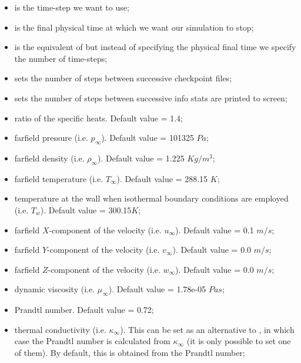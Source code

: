 \begin{itemize}
\item {} is the time-step we want to use;
\item {} is the final physical time at which we want our simulation to stop;
\item {} is the equivalent of  but instead of specifying the
physical final time we specify the number of time-steps;
\item {} sets the number of steps between successive checkpoint files;
\item {} sets the number of steps between successive info stats are printed
to screen;
\item {} ratio of the specific heats. Default value = 1.4;
\item {} farfield pressure (i.e. $p_{\infty}$). Default value = 101325 $Pa$;
\item {} farfield density (i.e. $\rho_{\infty}$). Default value = 1.225 $Kg/m^{3}$;
\item {} farfield temperature (i.e. $T_{\infty}$). Default value = 288.15 $K$;
\item {} temperature at the wall when isothermal boundary
conditions are employed (i.e. $T_{w}$). Default value = 300.15$K$;
\item {} farfield $X$-component of the velocity (i.e. $u_{\infty}$). Default value = 0.1 $m/s$;
\item {} farfield $Y$-component of the velocity (i.e. $v_{\infty}$). Default value = 0.0 $m/s$;
\item {} farfield $Z$-component of the velocity (i.e. $w_{\infty}$). Default value = 0.0 $m/s$;
\item {} dynamic viscosity (i.e. $\mu_{\infty}$). Default value = 1.78e-05 $Pa s$;
\item {} Prandtl number. Default value = 0.72;
\item {} thermal conductivity (i.e. $\kappa_{\infty}$). This can be set as an
 alternative to , in which case the Prandtl number is calculated from $\kappa_{\infty}$
 (it is only possible to set one of them). By default, this is obtained from the Prandtl number;
\end{itemize}

